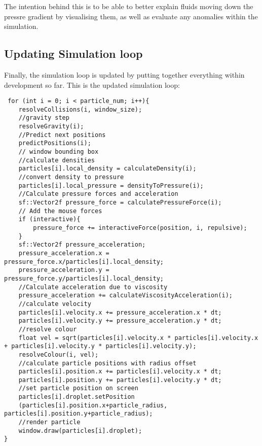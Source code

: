 \documentclass[write-up.tex]{subfiles}
\begin{document}
The intention behind this is to be able to better explain fluids moving down the pressre gradient by visualising them, as well as evaluate any anomalies within the simulation.
\subsection{Updating Simulation loop}
Finally, the simulation loop is updated by putting together everything within development so far. This is the updated simulation loop:

\begin{lstlisting}
 for (int i = 0; i < particle_num; i++){
    resolveCollisions(i, window_size);
    //gravity step
    resolveGravity(i);
    //Predict next positions
    predictPositions(i);
    // window bounding box
    //calculate densities
    particles[i].local_density = calculateDensity(i);
    //convert density to pressure
    particles[i].local_pressure = densityToPressure(i);
    //Calculate pressure forces and acceleration
    sf::Vector2f pressure_force = calculatePressureForce(i);
    // Add the mouse forces
    if (interactive){
        pressure_force += interactiveForce(position, i, repulsive);
    }
    sf::Vector2f pressure_acceleration;
    pressure_acceleration.x = pressure_force.x/particles[i].local_density;
    pressure_acceleration.y = pressure_force.y/particles[i].local_density;
    //Calculate acceleration due to viscosity
    pressure_acceleration += calculateViscosityAcceleration(i);
    //calculate velocity
    particles[i].velocity.x += pressure_acceleration.x * dt;
    particles[i].velocity.y += pressure_acceleration.y * dt;
    //resolve colour
    float vel = sqrt(particles[i].velocity.x * particles[i].velocity.x + particles[i].velocity.y * particles[i].velocity.y);
    resolveColour(i, vel);
    //calculate particle positions with radius offset
    particles[i].position.x += particles[i].velocity.x * dt;
    particles[i].position.y += particles[i].velocity.y * dt;
    //set particle position on screen
    particles[i].droplet.setPosition
    (particles[i].position.x+particle_radius, particles[i].position.y+particle_radius);
    //render particle
    window.draw(particles[i].droplet);
}
\end{lstlisting}
\pagebreak
\end{document}
